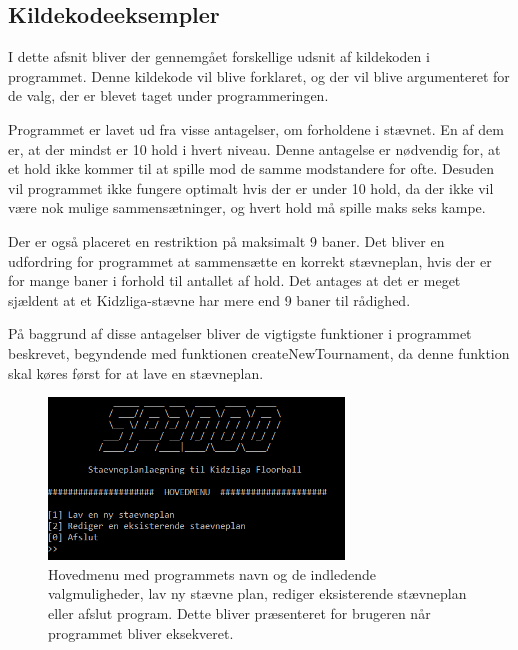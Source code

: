 \clearpage

\subsection{Kildekodeeksempler}
I dette afsnit bliver der gennemgået forskellige udsnit af kildekoden i programmet. Denne kildekode vil blive forklaret, og der vil blive argumenteret for de valg, der er blevet taget under programmeringen.
\par
Programmet er lavet ud fra visse antagelser, om forholdene i stævnet. En af dem er, at der mindst er 10 hold i hvert niveau. Denne antagelse er nødvendig for, at et hold ikke kommer til at spille mod de samme modstandere for ofte. Desuden vil programmet ikke fungere optimalt hvis der er under 10 hold, da der ikke vil være nok mulige sammensætninger, og hvert hold må spille maks seks kampe.
\par
Der er også placeret en restriktion på maksimalt 9 baner. Det bliver en udfordring for programmet at sammensætte en korrekt stævneplan, hvis der er for mange baner i forhold til antallet af hold. Det antages at det er meget sjældent at et Kidzliga-stævne har mere end 9 baner til rådighed.
\par
På baggrund af disse antagelser bliver de vigtigste funktioner i programmet beskrevet, begyndende med funktionen createNewTournament, da denne funktion skal køres først for at lave en stævneplan.

\begin{figure}[H]
  \centering
  \includegraphics[width=0.7\textwidth]{figures/MainMenuScreenshot.PNG}
  \caption{Hovedmenu med programmets navn og de indledende valgmuligheder, lav ny stævne plan, rediger eksisterende stævneplan eller afslut program. Dette bliver præsenteret for brugeren når programmet bliver eksekveret.}
  \label{fig:mainmenu}
\end{figure}

\clearpage

